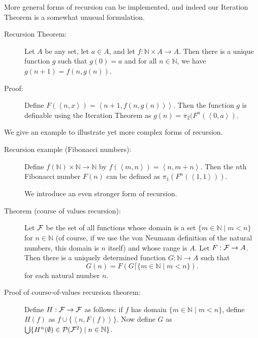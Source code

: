 \documentclass[12pt]{book}
\begin{document}
More general forms of recursion can be implemented, and indeed our Iteration Theorem is a somewhat unusual formulation.

\begin{description}

\item[Recursion Theorem:]  Let $A$ be any set, let $a \in A$, and let $f:{\mathbb N} \times A \rightarrow A$.  Then there is a unique function $g$
such that $g(0)=a$ and for all $n \in \mathbb N$, we have $g(n+1)=f(n,g(n))$.

\item[Proof:]  Define $F(\left<n,x\right>) = \left<n+1,f(n,g(n))\right>$.  Then the function $g$ is definable using the Iteration Theorem as
$g(n)=\pi_2(F^n(\left<0,a\right>)$.

\end{description}

We give an example to illustrate yet more complex forms of recursion.

\begin{description}


\item[Recursion example (Fibonacci numbers):]  Define $f({\mathbb N}) \times {\mathbb N} \rightarrow {\mathbb N}$ by $f(\left<m,n\right>) = \left<n,m+n\right>$.  Then the $n$th Fibonacci number $F(n)$ can be defined as $\pi_1(F^n(\left<1,1\right>))$.

We introduce an even stronger form of recursion.

\item[Theorem (course of values recursion):]  Let $\cal F$ be the set of all functions whose domain is a set $\{m \in {\mathbb N} \mid m<n\}$ for $n \in {\mathbb N}$ (of course, if we use the von Neumann definition of the natural numbers, this domain is $n$ itself) and whose range is $A$.  Let $F:{\cal F} \rightarrow A$.  Then there is a uniquely determined function $G:{\mathbb N} \rightarrow A$ such that $$G(n) = F(G \lceil \{m \in {\mathbb N}\mid m<n\}).$$ for each natural number $n$.

\item[Proof of course-of-values recursion theorem:]  Define $H:{\cal F} \rightarrow {\cal F}$ as follows:  if $f$ has domain $\{m \in {\mathbb N}\mid m<n\}$, define $H(f)$
as $f \cup \{\left<n,F(f)\right>\}$.  Now define $G$ as $\bigcup\{H^n(\emptyset) \in {\cal P}({\cal F}^2) \mid n \in \mathbb N\}$.

\end{description}
\end{document}
